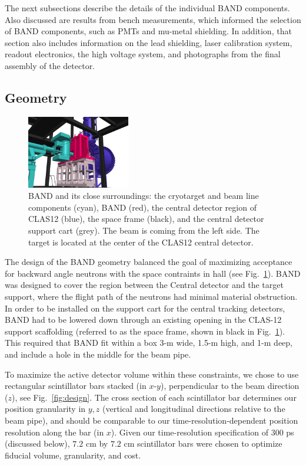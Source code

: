 \documentclass[3p,twocolumn]{elsarticle}
\begin{document}
The next subsections describe the details of the individual BAND components.
Also discussed are results from bench measurements, which informed the selection of
BAND components, such as PMTs and mu-metal shielding. In addition,
that section also includes information on the lead shielding, laser
calibration system, readout electronics, the high voltage system, and
 photographs from the final assembly of the detector.


\subsection{Geometry}
\begin{figure}[tb]
	\centering
		\includegraphics[width=0.40\textwidth]{FULL_CONTEXT_STUDIE_3.jpg}
		\vspace{0.5cm}
	    \caption{BAND and its close surroundings: the
                  cryotarget and beam line components (cyan),  BAND
                  (red), the central detector region of CLAS12
                  (blue), the space frame (black), and the central detector support cart (grey). The beam is coming from the left side. The
                  target is located at the center of the CLAS12 central detector.}
		\label{fig:bandtarget}
		
\end{figure}

The design of the BAND geometry balanced the goal of maximizing acceptance for backward angle neutrons
with the space contraints in hall (see Fig.~\ref{fig:bandtarget}). BAND was designed to cover the region
between the Central detector and the target support, where the flight path of the neutrons had minimal
material obstruction. In order to be installed on the support cart for the central tracking detectors, BAND
had to be lowered down through an existing opening in the CLAS-12 support scaffolding (referred to as the space
frame, shown in black in Fig.~\ref{fig:bandtarget}). This required that BAND fit within a box 3-\si{\meter} wide, 1.5-\si{\meter} high, and 1-\si{\meter} deep, and include a hole in the middle for the beam pipe. 


To maximize the active detector volume within these constraints, we
chose to use rectangular scintillator bars stacked (in $x$-$y$), perpendicular to
the beam direction ($z$), see Fig.~\ref{fig:design}.  The cross
section of each scintillator bar determines our position granularity
in $y,z$ (vertical and longitudinal directions relative to the beam
pipe), and should be comparable to our time-resolution-dependent position
resolution along the bar (in $x$). Given our time-resolution specification of
$300$ \si{\pico\second} (discussed below), $7.2$
\si{\centi\meter} by $7.2$ \si{\centi\meter} scintillator bars were
chosen to optimize fiducial volume, granularity, and cost.
\end{document}
